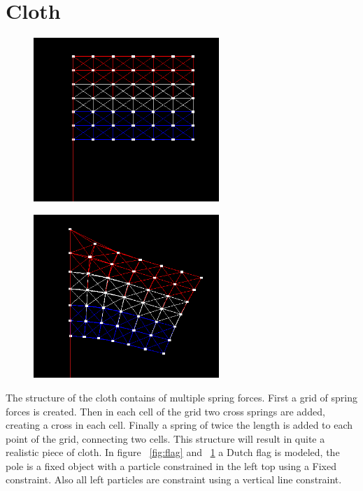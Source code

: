 \section{Cloth}

\begin{figure}[h!]
\centering
\begin{minipage}[t]{.45\textwidth}
  \centering
  \includegraphics[width=7cm]{img/flag.png}
  \label{fig:flag}
\end{minipage}\hfill
\begin{minipage}[t]{.45\textwidth}
  \centering
  \includegraphics[width=7cm]{img/flag2.png}
  \label{fig:flag2}
\end{minipage}
\end{figure}

\noindent The structure of the cloth contains of multiple spring forces.
First a grid of spring forces is created.
Then in each cell of the grid two cross springs are added, creating a cross in each cell.
Finally a spring of twice the length is added to each point of the grid, connecting two cells.
This structure will result in quite a realistic piece of cloth.
In figure ~\ref{fig:flag} and ~\ref{fig:flag2} a Dutch flag is modeled, the pole is a fixed object with a particle constrained in the left top using a Fixed constraint. Also all left particles are constraint using a vertical line constraint.